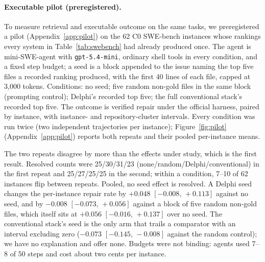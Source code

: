 \documentclass{article}
\newcommand{\ci}[2]{{\footnotesize$[#1,\,#2]$}}
\newcommand{\system}{Delphi}
\begin{document}
\paragraph{Executable pilot (preregistered).} To measure retrieval and executable outcome on the same tasks, we preregistered a pilot (Appendix~\ref{app:pilot}) on the 62 C0 SWE-bench instances whose rankings every system in Table~\ref{tab:swebench} had already produced once. The agent is mini-SWE-agent with \texttt{gpt-5.4-mini}, ordinary shell tools in every condition, and a fixed step budget; a seed is a block appended to the issue naming the top five files a recorded ranking produced, with the first 40 lines of each file, capped at 3{,}000 tokens. Conditions: no seed; five random non-gold files in the same block (prompting control); \system{}'s recorded top five; the full conventional stack's recorded top five. The outcome is verified repair under the official harness, paired by instance, with instance- and repository-cluster intervals. Every condition was run twice (two independent trajectories per instance); Figure~\ref{fig:pilot} (Appendix~\ref{app:pilot}) reports both repeats and their pooled per-instance means.

The two repeats disagree by more than the effects under study, which is the first result. Resolved counts were 25/30/31/23 (none/random/\system{}/conventional) in the first repeat and 25/27/25/25 in the second; within a condition, 7--10 of 62 instances flip between repeats. Pooled, no seed effect is resolved. A \system{} seed changes the per-instance repair rate by $+0.048$ \ci{-0.008}{+0.113} against no seed, and by $-0.008$ \ci{-0.073}{+0.056} against a block of five random non-gold files, which itself sits at $+0.056$ \ci{-0.016}{+0.137} over no seed. The conventional stack's seed is the only arm that trails a comparator with an interval excluding zero ($-0.073$ \ci{-0.145}{-0.008} against the random control); we have no explanation and offer none. Budgets were not binding: agents used 7--8 of 50 steps and cost about two cents per instance.
\end{document}
